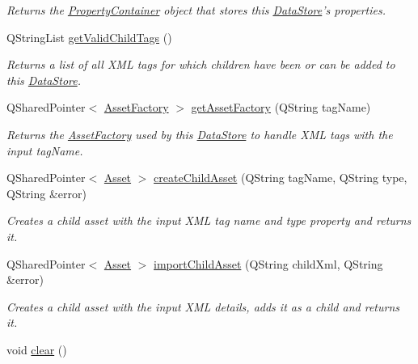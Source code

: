 \begin{DoxyCompactItemize}
\begin{DoxyCompactList}\small\item\em Returns the \hyperlink{class_picto_1_1_property_container}{Property\-Container} object that stores this \hyperlink{class_picto_1_1_data_store}{Data\-Store}'s properties. \end{DoxyCompactList}\item 
\hypertarget{class_picto_1_1_data_store_acb8c0b7c2a2ae0c5cdedb0ffdc4b0d6a}{Q\-String\-List \hyperlink{class_picto_1_1_data_store_acb8c0b7c2a2ae0c5cdedb0ffdc4b0d6a}{get\-Valid\-Child\-Tags} ()}\label{class_picto_1_1_data_store_acb8c0b7c2a2ae0c5cdedb0ffdc4b0d6a}

\begin{DoxyCompactList}\small\item\em Returns a list of all X\-M\-L tags for which children have been or can be added to this \hyperlink{class_picto_1_1_data_store}{Data\-Store}. \end{DoxyCompactList}\item 
\hypertarget{class_picto_1_1_data_store_a768db58ee6c2f4ce6671e41c59438456}{Q\-Shared\-Pointer$<$ \hyperlink{class_picto_1_1_asset_factory}{Asset\-Factory} $>$ \hyperlink{class_picto_1_1_data_store_a768db58ee6c2f4ce6671e41c59438456}{get\-Asset\-Factory} (Q\-String tag\-Name)}\label{class_picto_1_1_data_store_a768db58ee6c2f4ce6671e41c59438456}

\begin{DoxyCompactList}\small\item\em Returns the \hyperlink{class_picto_1_1_asset_factory}{Asset\-Factory} used by this \hyperlink{class_picto_1_1_data_store}{Data\-Store} to handle X\-M\-L tags with the input tag\-Name. \end{DoxyCompactList}\item 
Q\-Shared\-Pointer$<$ \hyperlink{class_picto_1_1_asset}{Asset} $>$ \hyperlink{class_picto_1_1_data_store_a35c2d1c958752bbb1a8269af42d89fef}{create\-Child\-Asset} (Q\-String tag\-Name, Q\-String type, Q\-String \&error)
\begin{DoxyCompactList}\small\item\em Creates a child asset with the input X\-M\-L tag name and type property and returns it. \end{DoxyCompactList}\item 
Q\-Shared\-Pointer$<$ \hyperlink{class_picto_1_1_asset}{Asset} $>$ \hyperlink{class_picto_1_1_data_store_a883e407e794dbca85b9891dd6abf0277}{import\-Child\-Asset} (Q\-String child\-Xml, Q\-String \&error)
\begin{DoxyCompactList}\small\item\em Creates a child asset with the input X\-M\-L details, adds it as a child and returns it. \end{DoxyCompactList}\item 
\hypertarget{class_picto_1_1_data_store_ad954c1c583e35cc633059f7b561adad9}{void \hyperlink{class_picto_1_1_data_store_ad954c1c583e35cc633059f7b561adad9}{clear} ()}\label{class_picto_1_1_data_store_ad954c1c583e35cc633059f7b561adad9}


\end{DoxyCompactItemize}
